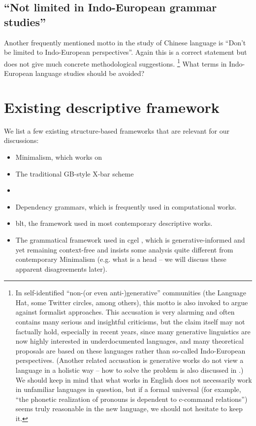\documentclass[../main.tex]{subfiles}
\begin{document}
\subsection{``Not limited in Indo-European grammar studies''}

Another frequently mentioned motto in the study of Chinese language is ``Don't be limited to Indo-European
perspectives''. Again this is a correct statement but does not give much concrete methodological suggestions.%
\footnote{
    In self-identified ``non-(or even anti-)generative'' communities (the Language Hat, some Twitter circles, 
    among others), this motto is also invoked to argue against formalist approaches. This accusation is very alarming and often contains many serious and insightful criticisms, but the claim itself may not factually 
    hold, especially in recent years, since many generative linguistics are now highly interested in
    underdocumented languages, and many theoretical proposals \citep{preminger2014agreement} are based on %
    these languages rather than so-called Indo-European perspectives. (Another related accusation is 
    generative works do not view a language in a holistic way -- how to solve the problem is also 
    discussed in .) We should keep in mind 
    that what works in English does not necessarily work in unfamiliar languages in question, but if 
    a formal universal (for example, ``the phonetic realization of pronouns is dependent to c-command relations'')
    seems truly reasonable in the new language, we should not hesitate to keep it.
}%
What terms in Indo-European language studies should be avoided?   

\section{Existing descriptive framework}\label{sec:descriptive-framework}

We list a few existing structure-based frameworks that are relevant for our discussions:
\begin{itemize}
    \item Minimalism, which works on 
    \item The traditional GB-style X-bar scheme
    \item {}  %
    \item Dependency grammars, which is frequently used in computational works.
    \item \ac{blt}, the framework used in most contemporary descriptive works.
    \item The grammatical framework used in \ac{cgel} \citep{cgel,pullum2008expressive}, which is generative-informed and yet remaining 
    context-free and insists some analysis quite different from contemporary Minimalism (e.g. 
    what is a head -- we will discuss these apparent disagreements later).
\end{itemize}
\end{document}
